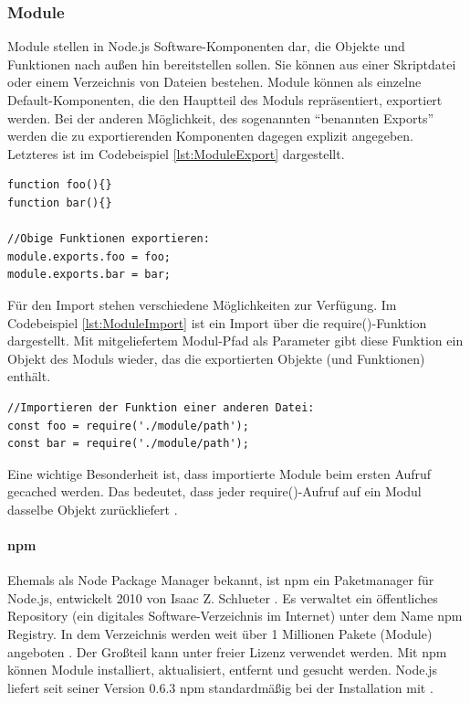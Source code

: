 \newpage
\subsubsection{Module}

\noindent
Module stellen in Node.js Software-Komponenten dar, die Objekte und Funktionen nach außen hin bereitstellen sollen.
Sie können aus einer Skriptdatei oder einem Verzeichnis von Dateien bestehen. Module können als einzelne Default-Komponenten, die den Hauptteil des Moduls repräsentiert, exportiert werden. 
Bei der anderen Möglichkeit, des sogenannten \enquote{benannten Exports} werden die zu exportierenden Komponenten dagegen explizit angegeben. Letzteres ist im Codebeispiel \ref{lst:ModuleExport} dargestellt. 
\newline
  
    
\begin{lstlisting}[caption=Benannter Export von Modulen,label=lst:ModuleExport]
function foo(){}
function bar(){}

//Obige Funktionen exportieren:
module.exports.foo = foo;
module.exports.bar = bar;
\end{lstlisting}


\noindent
Für den Import stehen verschiedene Möglichkeiten zur Verfügung.
Im Codebeispiel \ref{lst:ModuleImport} ist ein Import über die require()-Funktion dargestellt. 
Mit mitgeliefertem Modul-Pfad als Parameter gibt diese Funktion ein Objekt des Moduls wieder, das die exportierten Objekte (und Funktionen) enthält.
\newline
  
\begin{lstlisting}[caption=Import von Modulen,label=lst:ModuleImport]
//Importieren der Funktion einer anderen Datei:
const foo = require('./module/path');
const bar = require('./module/path');
\end{lstlisting}

\noindent
Eine wichtige Besonderheit ist, dass importierte Module  beim ersten Aufruf gecached werden. 
Das bedeutet, dass jeder require()-Aufruf auf ein Modul dasselbe Objekt zurückliefert \cite{Node1.21}.


\paragraph{npm}
Ehemals als Node Package Manager bekannt, ist npm ein Paketmanager für Node.js, entwickelt 2010 von Isaac Z. Schlueter \cite{Node1.3}. Es verwaltet ein öffentliches Repository (ein digitales Software-Verzeichnis im Internet) unter dem Name npm Registry. In dem Verzeichnis werden weit über 1 Millionen Pakete (Module) angeboten \cite{Node1.4}. Der Großteil kann unter freier Lizenz verwendet werden. Mit npm können Module installiert, aktualisiert, entfernt und gesucht werden. Node.js liefert seit seiner Version 0.6.3 npm standardmäßig bei der Installation mit \cite{Node1.5}.

